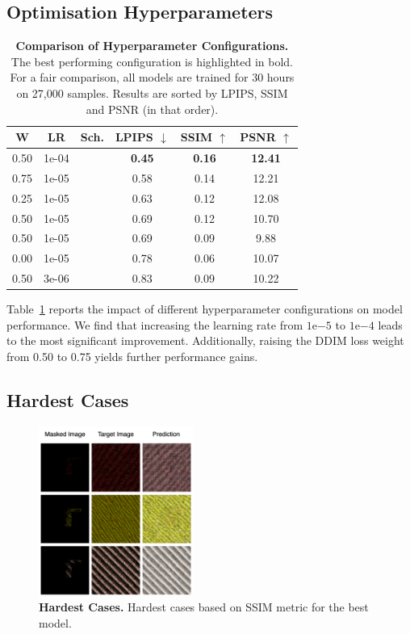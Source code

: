 \documentclass[11pt,twocolumn]{article}
\newcommand{\cmark}{\checkmark}
\newcommand{\xmark}{\ding{55}}
\begin{document}
\subsection{Optimisation Hyperparameters}
\begin{table}[t]
  \centering
  \begin{tabular}{ccc|ccc}
  \toprule
  \textbf{W} & \textbf{LR} & \textbf{Sch.} & \textbf{LPIPS} $\downarrow$ & \textbf{SSIM} $\uparrow$ & \textbf{PSNR} $\uparrow$ \\
  \midrule
  0.50 & 1e-04 & \xmark & \textbf{0.45} & \textbf{0.16} & \textbf{12.41} \\
  0.75 & 1e-05 & \xmark & 0.58 & 0.14 & 12.21 \\
  0.25 & 1e-05 & \xmark & 0.63 & 0.12 & 12.08 \\
  0.50 & 1e-05 & \cmark & 0.69 & 0.12 & 10.70 \\
  0.50 & 1e-05 & \xmark & 0.69 & 0.09 & 9.88 \\
  0.00 & 1e-05 & \xmark & 0.78 & 0.06 & 10.07 \\
  0.50 & 3e-06 & \xmark & 0.83 & 0.09 & 10.22 \\
  \bottomrule
  \end{tabular}
  \caption{\textbf{Comparison of Hyperparameter Configurations.} 
  The best performing configuration is highlighted in bold. For a 
  fair comparison, all models are trained for 30 hours on 27,000 samples. Results are sorted by LPIPS, SSIM and PSNR (in that order).}
  \label{tab:hyperparams}
\end{table}

Table~\ref{tab:hyperparams} reports the impact of different hyperparameter configurations on model performance. 
We find that increasing the learning rate from $1\text{e}{-5}$ to $1\text{e}{-4}$ leads to the most significant improvement. 
Additionally, raising the DDIM loss weight from 0.50 to 0.75 yields further performance gains.

\subsection{Hardest Cases}

\begin{figure}[t]
  \centering
  \includegraphics[width=0.45\textwidth]{figures/failure_cases.png}
  \caption{\textbf{Hardest Cases.} Hardest cases based on SSIM metric for the best model.}
  \label{fig:hardest-cases}
\end{figure}
\end{document}
